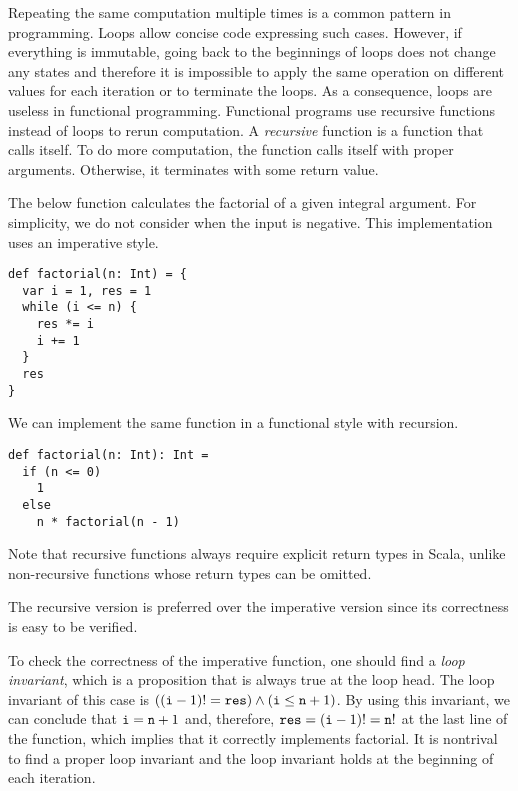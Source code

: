 Repeating the same computation multiple times is a common pattern in programming.
Loops allow concise code expressing such cases. However, if everything is
immutable, going back to the beginnings of loops does not change any states and
therefore it is impossible to apply the same operation on different values for
each iteration or to terminate the loops. As a consequence, loops are useless in
functional programming. Functional programs use recursive functions instead of
loops to rerun computation. A \textit{recursive}
function is a function that calls itself.
To do more computation, the function calls itself with proper arguments.
Otherwise, it terminates with some return value.

The below  function calculates the factorial of a given integral
argument. For simplicity, we do not consider when the input is negative.
This implementation uses an imperative style.

\begin{verbatim}
def factorial(n: Int) = {
  var i = 1, res = 1
  while (i <= n) {
    res *= i
    i += 1
  }
  res
}
\end{verbatim}

We can implement the same function in a functional style with recursion.

\begin{verbatim}
def factorial(n: Int): Int =
  if (n <= 0)
    1
  else
    n * factorial(n - 1)
\end{verbatim}

Note that recursive functions always require explicit return types in Scala,
unlike non-recursive functions whose return types can be omitted.

The recursive version is preferred over the imperative version since its
correctness is easy to be verified.

To check the correctness of the imperative
 function, one should find a \textit{loop invariant},
which is a proposition that is always true at the loop head.
The loop invariant of this case is
$((\texttt{i}-1)!=\texttt{res})\land(\texttt{i}\le\texttt{n}+1)$.
By using this invariant, we can conclude that $\texttt{i}=\texttt{n}+1$ and,
therefore, $\texttt{res}=(\texttt{i}-1)!=\texttt{n}!$ at the last line of the
function, which implies that it correctly implements factorial.
It is nontrival to find a proper loop invariant and the loop invariant holds at
the beginning of each iteration.


